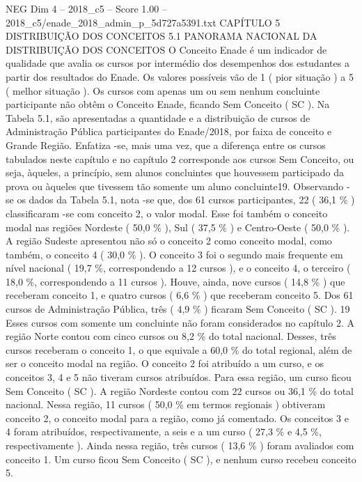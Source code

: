 \begin{textsample}{NEG Dim 4 – 2018\_c5 – Score 1.00 – 2018\_c5/enade\_2018\_admin\_p\_5d727a5391.txt}  \label{ex:f4_neg_133}
CAPÍTULO 5 DISTRIBUIÇÃO DOS CONCEITOS 5.1 PANORAMA NACIONAL DA DISTRIBUIÇÃO DOS CONCEITOS O Conceito Enade é um indicador de qualidade que avalia os cursos por intermédio dos desempenhos dos estudantes a partir dos resultados do Enade.
Os valores possíveis vão de 1 ( pior situação ) a 5 ( melhor situação ).
Os cursos com apenas um ou sem nenhum concluinte participante não obtêm o Conceito Enade, ficando Sem Conceito ( SC ).
Na Tabela 5.1, são apresentadas a quantidade e a distribuição de cursos de Administração Pública participantes do Enade/2018, por faixa de conceito e Grande Região.
Enfatiza -se, mais uma vez, que a diferença entre os cursos tabulados neste capítulo e no capítulo 2 corresponde aos cursos Sem Conceito, ou seja, àqueles, a princípio, sem alunos concluintes que houvessem participado da prova ou àqueles que tivessem tão somente um aluno concluinte19.
Observando -se os dados da Tabela 5.1, nota -se que, dos 61 cursos participantes, 22 ( 36,1 \% ) classificaram -se com conceito 2, o valor modal.
Esse foi também o conceito modal nas regiões Nordeste ( 50,0 \% ), Sul ( 37,5 \% ) e Centro-Oeste ( 50,0 \% ).
A região Sudeste apresentou não só o conceito 2 como conceito modal, como também, o conceito 4 ( 30,0 \% ).
O conceito 3 foi o segundo mais frequente em nível nacional ( 19,7 \%, correspondendo a 12 cursos ), e o conceito 4, o terceiro ( 18,0 \%, correspondendo a 11 cursos ).
Houve, ainda, nove cursos ( 14,8 \% ) que receberam conceito 1, e quatro cursos ( 6,6 \% ) que receberam conceito 5.
Dos 61 cursos de Administração Pública, três ( 4,9 \% ) ficaram Sem Conceito ( SC ). 19 Esses cursos com somente um concluinte não foram considerados no capítulo 2.
A região Norte contou com cinco cursos ou 8,2 \% do total nacional.
Desses, três cursos receberam o conceito 1, o que equivale a 60,0 \% do total regional, além de ser o conceito modal na região.
O conceito 2 foi atribuído a um curso, e os conceitos 3, 4 e 5 não tiveram cursos atribuídos.
Para essa região, um curso ficou Sem Conceito ( SC ).
A região Nordeste contou com 22 cursos ou 36,1 \% do total nacional.
Nessa região, 11 cursos ( 50,0 \% em termos regionais ) obtiveram conceito 2, o conceito modal para a região, como já comentado.
Os conceitos 3 e 4 foram atribuídos, respectivamente, a seis e a um curso ( 27,3 \% e 4,5 \%, respectivamente ).
Ainda nessa região, três cursos ( 13,6 \% ) foram avaliados com conceito 1.
Um curso ficou Sem Conceito ( SC ), e nenhum curso recebeu conceito 5.

\end{textsample}
